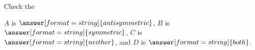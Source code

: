 \documentclass{ximera}
\begin{document}
\begin{exercise}
  \begin{hint}
  
    Check the %

  \end{hint}
  
  $A$ is $\answer[format=string]{antisymmetric}$, $B$ is $\answer[format=string]{symmetric}$, $C$ is $\answer[format=string]{neither}$, and $D$ is $\answer[format=string]{both}$.
\end{exercise}
\end{document}
